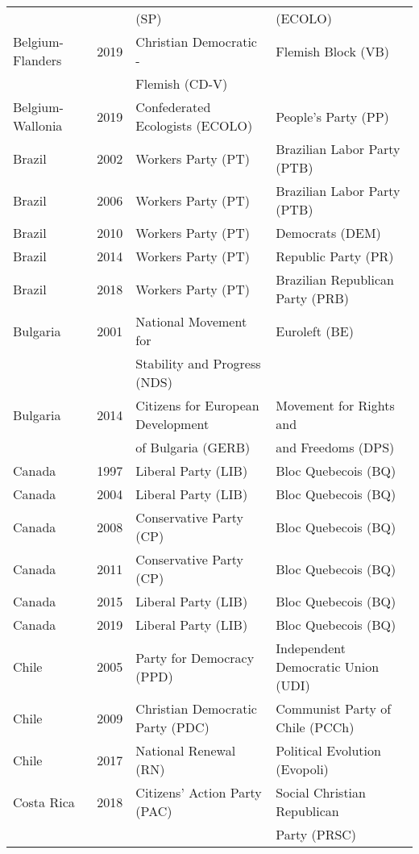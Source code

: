 {\begin{longtable}{|l|c|l|l|}
   &   &   (SP) &   (ECOLO) \\ 
Belgium-Flanders & 2019 & Christian Democratic -   &  Flemish Block  (VB)\\ 
 &  & Flemish (CD-V) &   \\ 
Belgium-Wallonia & 2019 &  Confederated Ecologists (ECOLO) &  People's Party (PP)\\ 
%
Brazil & 2002 &   Workers Party (PT) &   Brazilian Labor Party (PTB) \\ 
  Brazil & 2006 &   Workers Party (PT) &   Brazilian Labor Party (PTB) \\ 
Brazil & 2010 &   Workers Party (PT) &   Democrats (DEM)  \\ 
Brazil & 2014 &   Workers Party (PT) &   Republic Party (PR)   \\ 
Brazil & 2018 &   Workers Party (PT) &   Brazilian Republican Party (PRB)  \\ 
%
Bulgaria & 2001 &   National Movement for   &   Euroleft (BE) \\ 
    &   &    Stability and Progress (NDS) &    \\ 
Bulgaria & 2014 &   Citizens for European Development   &   Movement for Rights and   \\ 
    &   &    of Bulgaria (GERB) &     and Freedoms (DPS) \\ 
%
Canada & 1997 &   Liberal Party (LIB) &   Bloc Quebecois (BQ)   \\ 
Canada & 2004 &   Liberal Party (LIB) &   Bloc Quebecois (BQ)   \\ 
Canada & 2008 &   Conservative Party (CP) &   Bloc Quebecois (BQ)   \\ 
  Canada & 2011 &   Conservative Party (CP) &   Bloc Quebecois (BQ)   \\ 
Canada & 2015 &   Liberal Party (LIB) &   Bloc Quebecois (BQ)   \\ 
Canada & 2019 &   Liberal Party (LIB) &   Bloc Quebecois (BQ)   \\ 
%
Chile & 2005 &   Party for Democracy (PPD) &   Independent Democratic Union (UDI) \\ 
  Chile & 2009 &   Christian Democratic Party (PDC) &   Communist Party of Chile (PCCh) \\ 
Chile & 2017 &   National Renewal (RN) &   Political Evolution (Evopoli) \\ 
%
Costa Rica & 2018 &   Citizens' Action Party (PAC) &   Social Christian Republican \\ 
               &      &       &    Party (PRSC)  \\ 

\end{longtable}}
